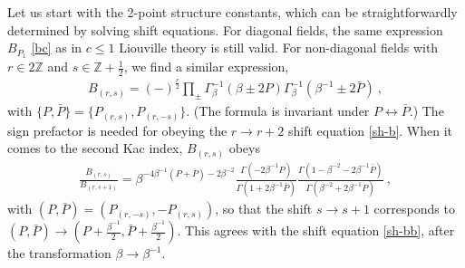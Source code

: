 \documentclass[12pt, a4paper]{article}
\theoremstyle{break}
\begin{document}
Let us start with the 2-point structure constants, which can be straightforwardly determined by solving shift equations. For diagonal fields, the same expression $B_{P_1}$ \eqref{bc} as in $c\leq 1$ Liouville theory is still valid. For non-diagonal fields with $r\in 2\mathbb{Z}$ and $s\in\mathbb{Z}+\frac12$, we find a similar expression,
\begin{align}
 \boxed{B_{(r,s)} = (-)^\frac{r}{2} \prod_\pm \Gamma_\beta^{-1}\left(\beta\pm 2P\right)\Gamma_\beta^{-1}\left(\beta^{-1}\pm 2\bar P\right)}\ ,
 \label{nbrs}
\end{align}
with $\{P,\bar P\}=\{P_{(r,s)},P_{(r,-s)}\}$. (The formula is invariant under $P\leftrightarrow \bar P$.)
The sign prefactor is needed for obeying the $r\to r+2$ shift equation \eqref{sh-b}. When it comes to the second Kac index, $B_{(r,s)}$ obeys
\begin{align}
 \frac{B_{(r,s)}}{B_{(r,s+1)}} = \beta^{-4\beta^{-1}(P+\bar P)-2\beta^{-2}} \frac{\Gamma(-2\beta^{-1}P)}{\Gamma(1+2\beta^{-1}\bar P)} \frac{\Gamma(1-\beta^{-2}-2\beta^{-1}\bar P)}{\Gamma(\beta^{-2}+2\beta^{-1} P)} \ ,
\end{align}
with $(P, \bar P)=(P_{(r,-s)},-P_{(r,s)})$, so that the shift $s\to s+1$ corresponds to $(P,\bar P)\to (P+\frac{\beta^{-1}}{2},\bar P+\frac{\beta^{-1}}{2})$. This agrees with the shift equation \eqref{sh-bb}, after the transformation $\beta \to \beta^{-1}$. 
\end{document}
